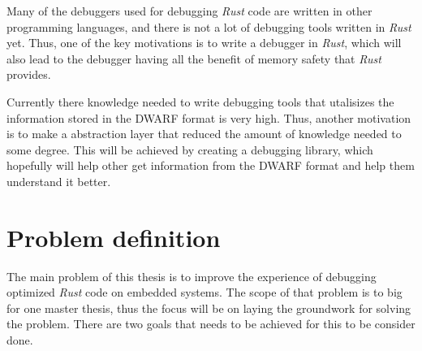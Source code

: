 Many of the debuggers used for debugging \emph{Rust} code are written in other programming languages, and there is not a lot of debugging tools written in \emph{Rust} yet.
Thus, one of the key motivations is to write a debugger in \emph{Rust}, which will also lead to the debugger having all the benefit of memory safety that \emph{Rust} provides.


Currently there knowledge needed to write debugging tools that utalisizes the information stored in the \gls{DWARF} format is very high.
Thus, another motivation is to make a abstraction layer that reduced the amount of knowledge needed to some degree.
This will be achieved by creating a debugging library, which hopefully will help other get information from the \gls{DWARF} format and help them understand it better.


\section{Problem definition}
 

The main problem of this thesis is to improve the experience of debugging optimized \emph{Rust} code on embedded systems.
The scope of that problem is to big for one master thesis, thus the focus will be on laying the groundwork for solving the problem.
There are two goals that needs to be achieved for this to be consider done.


